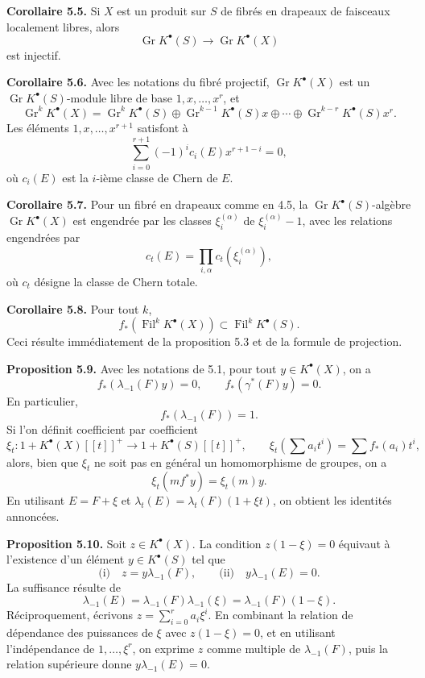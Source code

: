 \documentclass[11pt]{article}
\newcommand{\Gr}{\operatorname{Gr}}
\newcommand{\Fil}{\operatorname{Fil}}
\providecommand{\Gr}{\operatorname{Gr}}
\providecommand{\Gr}{\operatorname{G}}
\begin{document}
\textbf{Corollaire 5.5.} Si \(X\) est un produit sur \(S\) de fibrés en drapeaux de faisceaux localement libres, alors
\[
  \Gr K^\bullet(S)\longrightarrow \Gr K^\bullet(X)
\]
est injectif.

\textbf{Corollaire 5.6.} Avec les notations du fibré projectif, \(\Gr K^\bullet(X)\) est un \(\Gr K^\bullet(S)\)-module libre de base \(1,x,\ldots,x^r\), et
\[
  \Gr^kK^\bullet(X)=\Gr^kK^\bullet(S)\oplus\Gr^{k-1}K^\bullet(S)x\oplus\cdots\oplus\Gr^{k-r}K^\bullet(S)x^r.
\]
Les éléments \(1,x,\ldots,x^{r+1}\) satisfont à
\[
  \sum_{i=0}^{r+1}(-1)^ic_i(E)x^{r+1-i}=0,
\]
où \(c_i(E)\) est la \(i\)-ième classe de Chern de \(E\).

\textbf{Corollaire 5.7.} Pour un fibré en drapeaux comme en 4.5, la \(\Gr K^\bullet(S)\)-algèbre \(\Gr K^\bullet(X)\) est engendrée par les classes \(\xi_i^{(\alpha)}\) de \(\xi_i^{(\alpha)}-1\), avec les relations engendrées par
\[
  c_t(E)=\prod_{i,\alpha}c_t(\xi_i^{(\alpha)}),
\]
où \(c_t\) désigne la classe de Chern totale.

\textbf{Corollaire 5.8.} Pour tout \(k\),
\[
  f_*(\Fil^kK^\bullet(X))\subset \Fil^kK^\bullet(S).
\]
Ceci résulte immédiatement de la proposition 5.3 et de la formule de projection.

\textbf{Proposition 5.9.} Avec les notations de 5.1, pour tout \(y\in K^\bullet(X)\), on a
\[
  f_*(\lambda_{-1}(F)y)=0,
  \qquad f_*(\gamma^*(F)y)=0.
\]
En particulier,
\[
  f_*(\lambda_{-1}(F))=1.
\]
Si l'on définit coefficient par coefficient
\[
  \xi_t:1+K^\bullet(X)[[t]]^+\longrightarrow 1+K^\bullet(S)[[t]]^+,
\qquad
  \xi_t\left(\sum a_it^i\right)=\sum f_*(a_i)t^i,
\]
alors, bien que \(\xi_t\) ne soit pas en général un homomorphisme de groupes, on a
\[
  \xi_t(mf^*y)=\xi_t(m)y.
\]
En utilisant \(E=F+\xi\) et \(\lambda_t(E)=\lambda_t(F)(1+\xi t)\), on obtient les identités annoncées.

\textbf{Proposition 5.10.} Soit \(z\in K^\bullet(X)\). La condition \(z(1-\xi)=0\) équivaut à l'existence d'un élément \(y\in K^\bullet(S)\) tel que
\[
  \text{(i)}\quad z=y\lambda_{-1}(F),
  \qquad
  \text{(ii)}\quad y\lambda_{-1}(E)=0.
\]
La suffisance résulte de
\[
  \lambda_{-1}(E)=\lambda_{-1}(F)\lambda_{-1}(\xi)=\lambda_{-1}(F)(1-\xi).
\]
Réciproquement, écrivons \(z=\sum_{i=0}^{r}a_i\xi^i\). En combinant la relation de dépendance des puissances de \(\xi\) avec \(z(1-\xi)=0\), et en utilisant l'indépendance de \(1,\ldots,\xi^r\), on exprime \(z\) comme multiple de \(\lambda_{-1}(F)\), puis la relation supérieure donne \(y\lambda_{-1}(E)=0\).
\end{document}
